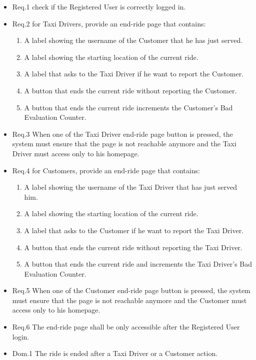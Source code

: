 				\begin{itemize}
					\item \lbrack Req.1\rbrack \label{sec:fr1_g8} check if the Registered User is correctly logged in.
					\item \lbrack Req.2\rbrack \label{sec:fr2_g8} for Taxi Drivers, provide an end-ride page that contains:
						\begin{enumerate}
							\item A label showing the username of the Customer that he has just served.
							\item A label showing the starting location of the current ride.
							\item A label that asks to the Taxi Driver if he want to report the Customer.
							\item A button that ends the current ride without reporting the Customer.
							\item A button that ends the current ride increments the Customer's Bad Evaluation Counter.
						\end{enumerate}
					\item \lbrack Req.3\rbrack \label{sec:fr3_g8} When one of the Taxi Driver end-ride page button is pressed, the system must ensure that the page is not reachable anymore and the Taxi Driver must access only to his homepage.
					\\
					\item \lbrack Req.4\rbrack \label{sec:fr4_g8} for Customers, provide an end-ride page that contains:
						\begin{enumerate}
							\item A label showing the username of the Taxi Driver that has just served him.
							\item A label showing the starting location of the current ride.
							\item A label that asks to the Customer if he want to report the Taxi Driver.
							\item A button that ends the current ride without reporting the Taxi Driver.
							\item A button that ends the current ride and increments the Taxi Driver's Bad Evaluation Counter.
						\end{enumerate}
					\item \lbrack Req.5\rbrack \label{sec:fr5_g8} When one of the Customer end-ride page button is pressed, the system must ensure that the page is not reachable anymore and the Customer must access only to his homepage.
					\item \lbrack Req.6\rbrack \label{sec:fr6_g8} The end-ride page shall be only accessible after the Registered User login.
					\item \lbrack Dom.1\rbrack \label{sec:da1_g8} The ride is ended after a Taxi Driver or a Customer action.
				\end{itemize}

